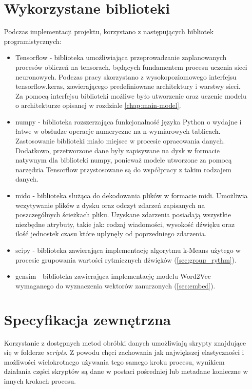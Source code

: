 {    \section{Wykorzystane biblioteki}
    {
        Podczas implementacji projektu, korzystano z następujących bibliotek programistycznych:
        \begin{itemize}
            \setlength\itemsep{-0.5em}
            \item Tensorflow - biblioteka umożliwiająca przeprowadzanie zaplanowanych procesów obliczeń na tensorach, będących fundamentem procesu uczenia sieci neuronowych. Podczas pracy skorzystano z wysokopoziomowego interfejsu tensorflow.keras, zawierającego predefiniowane architektury i warstwy sieci. Za pomocą interfejsu biblioteki możliwe było utworzenie oraz uczenie modelu o architekturze opisanej w rozdziale \ref{chap:main-model}.
            \item numpy - biblioteka rozszerzająca funkcjonalność języka Python o wydajne i łatwe w obsłudze operacje numeryczne na n-wymiarowych tablicach. Zastosowanie biblioteki miało miejsce w procesie opracowania danych. Dodatkowo, przetworzone dane były zapisywane na dysk w formacie natywnym dla biblioteki numpy, ponieważ modele utworzone za pomocą narzędzia Tensorflow przystosowane są do współpracy z takim rodzajem danych.
            \item mido - biblioteka służąca do dekodowania plików w formacie midi. Umożliwia wczytywanie plików z dysku oraz odczyt zdarzeń zapisanych na poszczególnych ścieżkach pliku. Uzyskane zdarzenia posiadają wszystkie niezbędne atrybuty, takie jak: rodzaj wiadomości, wysokość dźwięku oraz ilość jednostek czasu które upłynęły od poprzedniego zdarzenia.
            \item scipy - biblioteka zawierająca implementację algorytmu k-Means użytego w procesie grupowania wartości rytmicznych dźwięków (\ref{sec:group_rythm}).
            \item gensim - biblioteka zawierająca implementację modelu Word2Vec wymaganego do wyznaczenia wektorów zanurzonych (\ref{sec:embed}).
        \end{itemize}
    }

    \section{Specyfikacja zewnętrzna}
    {
        Korzystanie z dostępnych metod obróbki danych umożliwiają skrypty znajdujące się w folderze {\textit {{scripts}}}. Z powodu chęci zachowania jak największej elastyczności i możliwości wielokrotnego używania tego samego kroku procesu, wynikiem działania części skryptów są dane w postaci pośredniej lub metadane konieczne w innych krokach procesu.

}}
